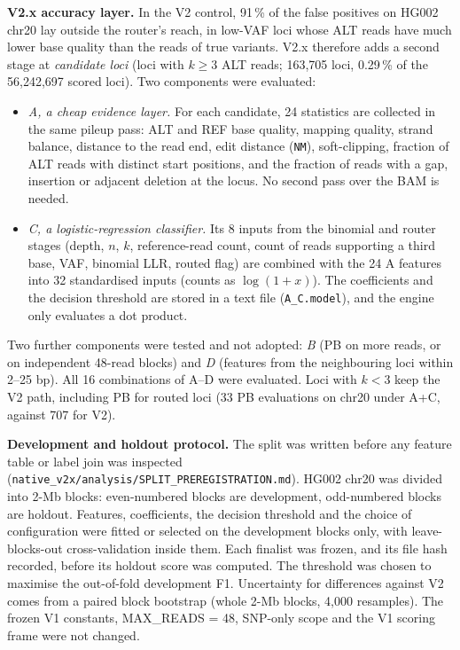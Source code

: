 \documentclass[11pt,a4paper]{article}
\begin{document}
\textbf{V2.x accuracy layer.} In the V2 control, 91\,\% of the false positives on HG002 chr20 lay outside the router's reach, in low-VAF loci whose ALT reads have much lower base quality than the reads of true variants. V2.x therefore adds a second stage at \emph{candidate loci} (loci with $k \ge 3$ ALT reads; 163,705 loci, 0.29\,\% of the 56,242,697 scored loci). Two components were evaluated:

\begin{itemize}[leftmargin=1.6em,itemsep=2pt,topsep=3pt]
\item \emph{A, a cheap evidence layer.} For each candidate, 24 statistics are collected in the same pileup pass: ALT and REF base quality, mapping quality, strand balance, distance to the read end, edit distance (\texttt{NM}), soft-clipping, fraction of ALT reads with distinct start positions, and the fraction of reads with a gap, insertion or adjacent deletion at the locus. No second pass over the BAM is needed.
\item \emph{C, a logistic-regression classifier.} Its 8 inputs from the binomial and router stages (depth, $n$, $k$, reference-read count, count of reads supporting a third base, VAF, binomial LLR, routed flag) are combined with the 24 A features into 32 standardised inputs (counts as $\log(1+x)$). The coefficients and the decision threshold are stored in a text file (\texttt{A\_\allowbreak{}C.\allowbreak{}model}), and the engine only evaluates a dot product.
\end{itemize}
Two further components were tested and not adopted: \emph{B} (PB on more reads, or on independent 48-read blocks) and \emph{D} (features from the neighbouring loci within 2--25 bp). All 16 combinations of A--D were evaluated. Loci with $k < 3$ keep the V2 path, including PB for routed loci (33 PB evaluations on chr20 under A+C, against 707 for V2).

\textbf{Development and holdout protocol.} The split was written before any feature table or label join was inspected (\texttt{native\_\allowbreak{}v2x/\allowbreak{}analysis/\allowbreak{}SPLIT\_\allowbreak{}PREREGISTRATION.\allowbreak{}md}). HG002 chr20 was divided into 2-Mb blocks: even-numbered blocks are development, odd-numbered blocks are holdout. Features, coefficients, the decision threshold and the choice of configuration were fitted or selected on the development blocks only, with leave-blocks-out cross-validation inside them. Each finalist was frozen, and its file hash recorded, before its holdout score was computed. The threshold was chosen to maximise the out-of-fold development F1. Uncertainty for differences against V2 comes from a paired block bootstrap (whole 2-Mb blocks, 4,000 resamples). The frozen V1 constants, MAX\_READS = 48, SNP-only scope and the V1 scoring frame were not changed.
\end{document}
